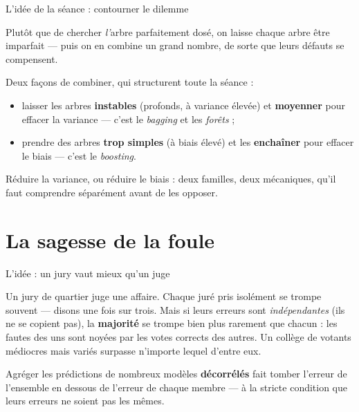 \documentclass[aspectratio=169,11pt]{beamer}
\begin{document}
\begin{frame}{L'idée de la séance : contourner le dilemme}
\begin{ucaddef}
{\small Plutôt que de chercher \emph{l'}arbre parfaitement dosé, on laisse chaque arbre être imparfait — puis on en combine un grand nombre, de sorte que leurs défauts se compensent.}
\end{ucaddef}
{\small Deux façons de combiner, qui structurent toute la séance :}
\begin{itemize}\small
  \item laisser les arbres \textbf{instables} (profonds, à variance élevée) et \textbf{moyenner} pour effacer la variance — c'est le \emph{bagging} et les \emph{forêts} ;
  \item prendre des arbres \textbf{trop simples} (à biais élevé) et les \textbf{enchaîner} pour effacer le biais — c'est le \emph{boosting}.
\end{itemize}
{\small Réduire la variance, ou réduire le biais : deux familles, deux mécaniques, qu'il faut comprendre séparément avant de les opposer.}
\end{frame}

\section{La sagesse de la foule}

\begin{frame}{L'idée : un jury vaut mieux qu'un juge}
\begin{ucadfront}[Analogie]
{\small Un jury de quartier juge une affaire. Chaque juré pris isolément se trompe souvent — disons une fois sur trois. Mais si leurs erreurs sont \emph{indépendantes} (ils ne se copient pas), la \textbf{majorité} se trompe bien plus rarement que chacun : les fautes des uns sont noyées par les votes corrects des autres. Un collège de votants médiocres mais variés surpasse n'importe lequel d'entre eux.}
\end{ucadfront}
\begin{ucaddef}
{\small Agréger les prédictions de nombreux modèles \textbf{décorrélés} fait tomber l'erreur de l'ensemble en dessous de l'erreur de chaque membre — à la stricte condition que leurs erreurs ne soient pas les mêmes.}
\end{ucaddef}
\end{frame}
\end{document}
